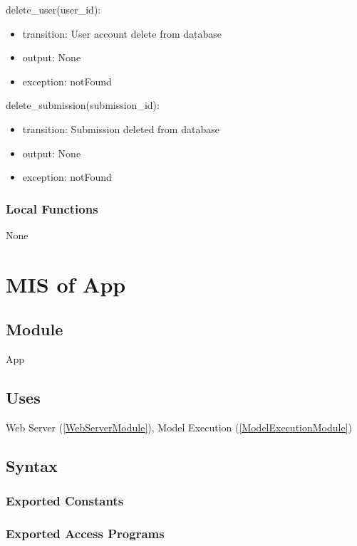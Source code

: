 \documentclass[12pt, titlepage]{article}
\begin{document}
\noindent delete\_user(user\_id):
\begin{itemize}
\item transition: User account delete from database
\item output: None
\item exception: notFound
\end{itemize}

\noindent delete\_submission(submission\_id):
\begin{itemize}
\item transition: Submission deleted from database
\item output: None
\item exception: notFound
\end{itemize}

\subsubsection{Local Functions}

None

\newpage

\section{MIS of App} \label{AppModule}

\subsection{Module}

App

\subsection{Uses}

Web Server (\ref{WebServerModule}), Model Execution (\ref{ModelExecutionModule})
\subsection{Syntax}

\subsubsection{Exported Constants}

\subsubsection{Exported Access Programs}
\end{document}
